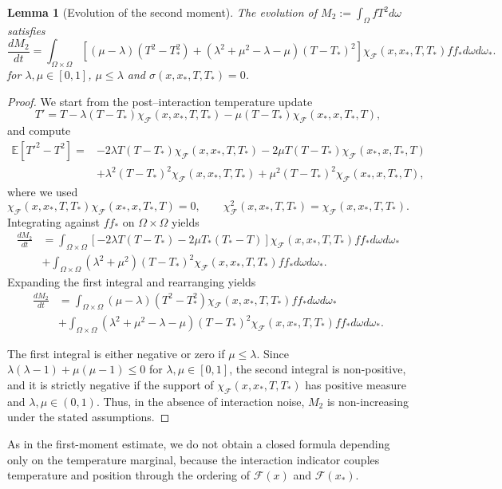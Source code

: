 \documentclass[10pt,a4paper]{article}
\theoremstyle{theorem}
\newtheorem{lemma}{Lemma}[section]
\numberwithin{equation}{section}
\begin{document}
\begin{lemma}[Evolution of the second moment]
\label{lemma:moment2}
The evolution of $
M_2:=\int_{\Omega}fT^2d\omega$
satisfies
 \begin{equation*}
\frac{dM_2}{dt}=\int_{\Omega\times\Omega}\left[(\mu-\lambda)(T^2-T_*^2)+(\lambda^2+\mu^2-\lambda-\mu)(T-T_*)^2\right]\chi_\mathcal{F}(x,x_*,T,T_*)ff_*d\omega d\omega_*.
\end{equation*}
for $\lambda,\mu\in [0,1]$, $\mu\leq\lambda$ and $\sigma(x,x_*,T,T_*)=0$. 
\end{lemma}

\begin{proof}
We start from the post–interaction temperature update
\[
T' = T - \lambda (T - T_*)\chi_\mathcal{F}(x,x_*,T,T_*) - \mu (T - T_*)\chi_\mathcal{F}(x_*,x,T_*,T),
\]
and compute
\[
\begin{split}
\mathbb{E}[T'^2 - T^2]
= &-2\lambda T(T-T_*)\chi_\mathcal{F}(x,x_*,T,T_*) 
  -2\mu T(T-T_*)\chi_\mathcal{F}(x_*,x,T_*,T)\\
  &+ \lambda^2 (T-T_*)^2\chi_\mathcal{F}(x,x_*,T,T_*) 
  + \mu^2 (T-T_*)^2\chi_\mathcal{F}(x_*,x,T_*,T),
  \end{split}
\]
where we used  
\[
\chi_\mathcal{F}(x,x_*,T,T_*)\chi_\mathcal{F}(x_*,x,T_*,T)=0,\qquad \chi^2_\mathcal{F}(x,x_*,T,T_*)=\chi_\mathcal{F}(x,x_*,T,T_*).
\]
Integrating against $ff_*$ on $\Omega\times\Omega$ yields
\begin{equation*}
\begin{split}
\frac{dM_2}{dt}&=\int_{\Omega\times\Omega}\left[-2\lambda T(T-T_*)-2\mu T_*(T_*-T)\right]\chi_\mathcal{F}(x,x_*,T,T_*)ff_*d\omega d\omega_*\\
&+\int_{\Omega\times\Omega}(\lambda^2+\mu^2)(T-T_*)^2\chi_\mathcal{F}(x,x_*,T,T_*)ff_*d\omega d\omega_*.
\end{split}
\end{equation*}
Expanding the first integral and rearranging yields
 \begin{equation*}
\begin{split}
\frac{dM_2}{dt}&=\int_{\Omega\times\Omega}(\mu-\lambda)(T^2-T_*^2)\chi_\mathcal{F}(x,x_*,T,T_*)ff_*d\omega d\omega_*\\
&+\int_{\Omega\times\Omega}(\lambda^2+\mu^2-\lambda-\mu)(T-T_*)^2\chi_\mathcal{F}(x,x_*,T,T_*)ff_*d\omega d\omega_*.
\end{split}
\end{equation*}

The first integral is either negative or zero if $\mu\leq\lambda$. Since $\lambda(\lambda-1)+\mu(\mu-1)\leq 0$ for $\lambda,\mu\in[0,1]$, the second integral is non-positive, and it is strictly negative if the support of
$\chi_\mathcal{F}(x,x_*,T,T_*)$ has positive measure and $\lambda,\mu\in(0,1)$.
Thus, in the absence of interaction noise, \(M_2\) is non-increasing under the
stated assumptions. 
\end{proof}
As in the first-moment estimate, we do not obtain a closed
formula depending only on the temperature marginal, because the interaction
indicator couples temperature and position through the ordering of
\(\mathcal F(x)\) and \(\mathcal F(x_*)\).
\end{document}
